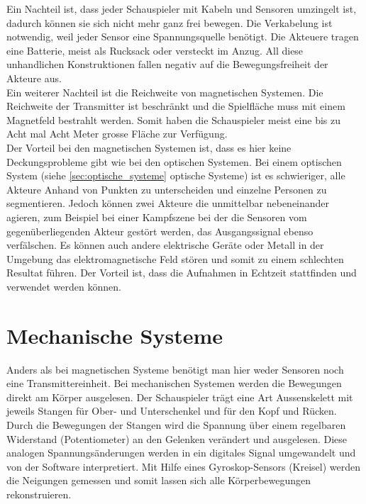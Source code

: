 Ein Nachteil ist, dass jeder Schauspieler mit Kabeln und Sensoren umzingelt ist, dadurch können sie sich nicht mehr ganz frei bewegen. Die Verkabelung ist notwendig, weil jeder Sensor eine Spannungsquelle benötigt. Die Akteuere tragen eine Batterie, meist als Rucksack oder versteckt im Anzug. All diese unhandlichen Konstruktionen fallen negativ auf die Bewegungsfreiheit der Akteure aus. \\
Ein weiterer Nachteil ist die Reichweite von magnetischen Systemen. Die Reichweite der Transmitter ist beschränkt und die Spielfläche muss mit einem Magnetfeld bestrahlt werden. Somit haben die Schauspieler meist eine bis zu Acht mal Acht Meter grosse Fläche zur Verfügung. \\
Der Vorteil bei den magnetischen Systemen ist, dass es hier keine Deckungsprobleme gibt wie bei den optischen Systemen. Bei einem optischen System
(siehe \ref{sec:optische_systeme} optische Systeme)
ist es schwieriger, alle Akteure Anhand von Punkten zu unterscheiden und einzelne Personen zu segmentieren. 
Jedoch können zwei Akteure die unmittelbar nebeneinander agieren, zum Beispiel bei einer Kampfszene bei der die Sensoren vom gegenüberliegenden Akteur gestört werden, das Ausgangssignal ebenso verfälschen. Es können auch andere elektrische Geräte oder Metall in der Umgebung das elektromagnetische Feld stören und somit zu einem schlechten Resultat führen. Der Vorteil ist, dass die Aufnahmen in Echtzeit stattfinden und verwendet werden können.

\section{Mechanische Systeme}

Anders als bei magnetischen Systeme benötigt man hier weder Sensoren noch eine Transmittereinheit. Bei mechanischen Systemen werden die Bewegungen direkt am Körper ausgelesen. Der Schauspieler trägt eine Art Aussenskelett mit jeweils Stangen für Ober- und Unterschenkel und für den Kopf und Rücken. Durch die Bewegungen der Stangen wird die Spannung über einem regelbaren Widerstand (Potentiometer) an den Gelenken verändert und ausgelesen. Diese analogen Spannungsänderungen werden in ein digitales Signal umgewandelt und von der Software interpretiert.
Mit Hilfe eines Gyroskop-Sensors (Kreisel) werden die Neigungen gemessen und somit lassen sich alle Körperbewegungen rekonstruieren. 

